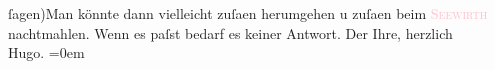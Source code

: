                   ſagen)\hspace*{1.5em}Man könnte dann vielleicht zuſa{\geminationm}en herumgehen u zuſa{\geminationm}en
               beim \textcolor{pink}{\textsc{Seewirth}}{}\ledrightnote{\textcolor{pink}{Seewirt}} nachtmahlen. Wenn es paſst bedarf es keiner Antwort.\pend
           \pstart
           Der Ihre, herzlich{\\[\baselineskip]}\spacefill\mbox{Hugo.}\pend
           \leftskip=0em{}\endnumbering{}  
      